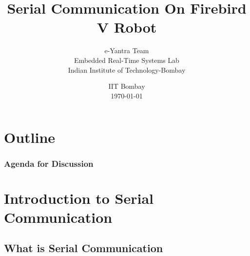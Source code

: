 \documentclass[table,10pt,red]{beamer}	%
\title
[
	Firebird ATmega2560 Robotics Research Platform	%
	\hspace{0.5cm}
	\insertframenumber/\inserttotalframenumber
]
{
	Serial Communication On Firebird V Robot
}
\author
[
	www.e-yantra.org 	%
]
{
	e-Yantra Team \\
  Embedded Real-Time Systems Lab\\
  Indian Institute of Technology-Bombay \\
}
\date
{
IIT Bombay \\ {\today}	%
}
\begin{document}

\begin{frame}	%
	\titlepage %
\end{frame}
\section*{Outline}
\begin{frame}
	\frametitle{Agenda for Discussion} %
	\tableofcontents %
\end{frame}

\section{Introduction to Serial Communication} %

\subsection{What is Serial Communication} %
\end{document}
